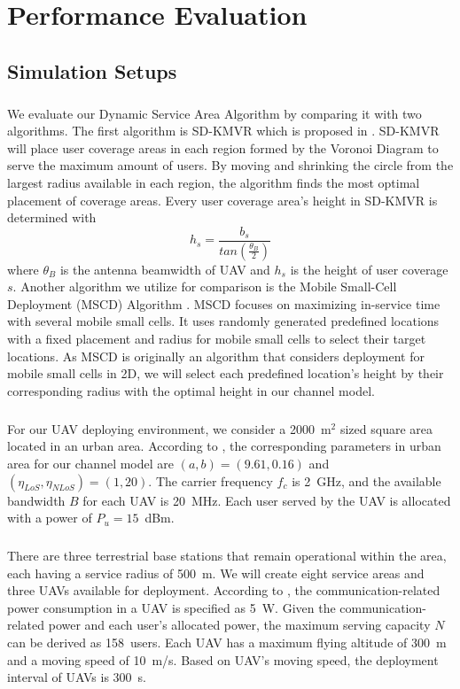 \documentclass[a4paper,12pt]{report}
\begin{document}
\chapter{Performance Evaluation}
\section{Simulation Setups}
\paragraph{}
We evaluate our Dynamic Service Area Algorithm by comparing it with two algorithms. The first algorithm is \mbox{SD-KMVR} which is proposed in \cite{b14}. SD-KMVR will place user coverage areas in each region formed by the Voronoi Diagram to serve the maximum amount of users. By moving and shrinking the circle from the largest radius available in each region, the algorithm finds the most optimal placement of coverage areas. Every user coverage area's height in SD-KMVR is determined with \begin{equation}\label{SD-KMVR height}
    h_s = \frac{b_s}{tan(\frac{\theta _B}{2})}
\end{equation}
where $\theta_B$ is the antenna beamwidth of UAV and $h_s$ is the height of user coverage $s$. Another algorithm we utilize for comparison is the Mobile Small-Cell Deployment (MSCD) Algorithm \cite{b12}. MSCD focuses on maximizing in-service time with several mobile small cells. It uses randomly generated predefined locations with a fixed placement and radius for mobile small cells to select their target locations. As MSCD is originally an algorithm that considers deployment for mobile small cells in 2D, we will select each predefined location's height by their corresponding radius with the optimal height in our channel model.
\paragraph{}
For our UAV deploying environment, we consider a 2000~m$^2$ sized square area located in an urban area. According to \cite{b8}, the corresponding parameters in urban area for our channel model are $(a, b)=(9.61, 0.16)$ and $(\eta _{LoS}, \eta _{NLoS})=(1, 20)$. The carrier frequency $f_c$ is 2~GHz, and the available bandwidth $B$ for each UAV is 20~MHz. Each user served by the UAV is allocated with a power of $P_u = 15$~dBm.
\paragraph{}
There are three terrestrial base stations that remain operational within the area, each having a service radius of 500~m. We will create eight service areas and three UAVs available for deployment. According to \cite{b22}, the communication-related power consumption in a UAV is specified as 5~W. Given the communication-related power and each user's allocated power, the maximum serving capacity $N$ can be derived as 158~users. Each UAV has a maximum flying altitude of 300~m \cite{b23} and a moving speed of 10~m/s. Based on UAV's moving speed, the deployment interval of UAVs is 300~s.
\end{document}
